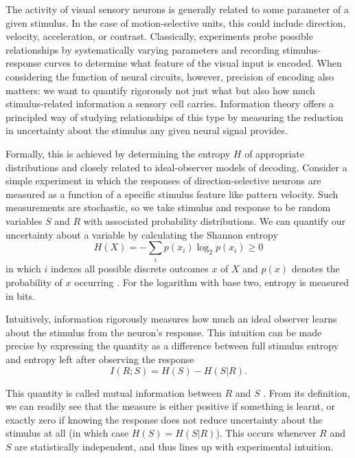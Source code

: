 The activity of visual sensory neurons is generally related to some parameter of a given stimulus. In the case of motion-selective units, this could include direction, velocity, acceleration, or contrast. Classically, experiments probe possible relationships by systematically varying parameters and recording stimulus-response curves to determine what feature of the visual input is encoded. When considering the function of neural circuits, however, precision of encoding also matters: we want to quantify rigorously not just what but also how much stimulus-related information a sensory cell carries. Information theory offers a principled way of studying relationships of this type by measuring the reduction in uncertainty about the stimulus any given neural signal provides.

Formally, this is achieved by determining the entropy $H$ of appropriate distributions and closely related to ideal-observer models of decoding. Consider a simple experiment in which the responses of direction-selective neurons are measured as a function of a specific stimulus feature like pattern velocity. Such measurements are stochastic, so we take stimulus and response to be random variables $S$ and $R$ with associated probability distributions. We can quantify our uncertainty about a variable by calculating the Shannon entropy
\begin{equation}
    H(X) = - \sum_{i} p(x_i) \log_2 p(x_i) \geq 0
\end{equation}
in which $i$ indexes all possible discrete outcomes $x$ of $X$ and $p(x)$ denotes the probability of $x$ occurring \citep{Cover:2006aa}. For the logarithm with base two, entropy is measured in bits.

Intuitively, information rigorously measures how much an ideal observer learns about the stimulus from the neuron's response. This intuition can be made precise by expressing the quantity as a difference between full stimulus entropy and entropy left after observing the response
\begin{equation}
    I(R; S) = H(S) - H(S|R).
\end{equation}

This quantity is called mutual information between $R$ and $S$ \citep{Cover:2006aa}. From its definition, we can readily see that the measure is either positive if something is learnt, or exactly zero if knowing the response does not reduce uncertainty about the stimulus at all (in which case $H(S) = H(S|R)$). This occurs whenever $R$ and $S$ are statistically independent, and thus lines up with experimental intuition.

